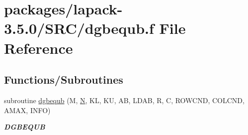 \hypertarget{dgbequb_8f}{}\section{packages/lapack-\/3.5.0/\+S\+R\+C/dgbequb.f File Reference}
\label{dgbequb_8f}
\subsection*{Functions/\+Subroutines}
\begin{DoxyCompactItemize}
\item 
subroutine \hyperlink{group__doubleGBcomputational_ga6ad24b82a2e754b670bbe3b223f0df3e}{dgbequb} (M, \hyperlink{polmisc_8c_a0240ac851181b84ac374872dc5434ee4}{N}, K\+L, K\+U, A\+B, L\+D\+A\+B, R, C, R\+O\+W\+C\+N\+D, C\+O\+L\+C\+N\+D, A\+M\+A\+X, I\+N\+F\+O)
\begin{DoxyCompactList}\small\item\em {\bfseries D\+G\+B\+E\+Q\+U\+B} \end{DoxyCompactList}\end{DoxyCompactItemize}
